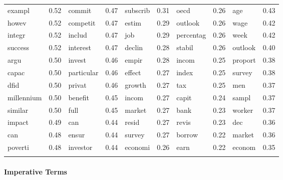 \documentclass[11pt,article,oneside]{memoir}
\begin{document}
\begin{longtable}[c]{@{}lrlrlrlrlr@{}}
exampl & 0.52 & commit & 0.47 & subscrib & 0.31 & oecd & 0.26 & age &
0.43
\\\addlinespace
howev & 0.52 & competit & 0.47 & estim & 0.29 & outlook & 0.26 & wage &
0.42
\\\addlinespace
integr & 0.52 & includ & 0.47 & job & 0.29 & percentag & 0.26 & week &
0.42
\\\addlinespace
success & 0.52 & interest & 0.47 & declin & 0.28 & stabil & 0.26 &
outlook & 0.40
\\\addlinespace
argu & 0.50 & invest & 0.46 & empir & 0.28 & incom & 0.25 & proport &
0.38
\\\addlinespace
capac & 0.50 & particular & 0.46 & effect & 0.27 & index & 0.25 & survey
& 0.38
\\\addlinespace
dfid & 0.50 & privat & 0.46 & growth & 0.27 & tax & 0.25 & men & 0.37
\\\addlinespace
millennium & 0.50 & benefit & 0.45 & incom & 0.27 & capit & 0.24 & sampl
& 0.37
\\\addlinespace
similar & 0.50 & full & 0.45 & market & 0.27 & bank & 0.23 & worker &
0.37
\\\addlinespace
impact & 0.49 & can & 0.44 & resid & 0.27 & revis & 0.23 & dec & 0.36
\\\addlinespace
can & 0.48 & ensur & 0.44 & survey & 0.27 & borrow & 0.22 & market &
0.36
\\\addlinespace
poverti & 0.48 & investor & 0.44 & economi & 0.26 & earn & 0.22 & econom
& 0.35
\\\addlinespace
\bottomrule
\end{longtable}

\pagebreak

\paragraph{Imperative Terms}\label{imperative-terms}
\end{document}
